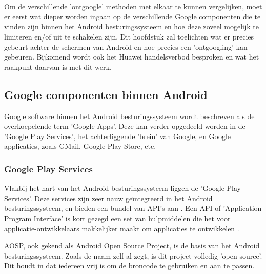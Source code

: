 \chapter{}
\label{ch:stand-van-zaken}



Om de verschillende 'ontgoogle' methoden met elkaar te kunnen vergelijken, moet er eerst wat dieper worden ingaan op de verschillende Google componenten die te vinden zijn binnen het Android besturingssysteem en hoe deze zoveel mogelijk te limiteren en/of uit te schakelen zijn. Dit hoofdstuk zal toelichten wat er precies gebeurt achter de schermen van Android en hoe precies een 'ontgoogling' kan gebeuren. Bijkomend wordt ook het Huawei handelsverbod besproken en wat het raakpunt daarvan is met dit werk.

\section{Google componenten binnen Android}
Google software binnen het Android besturingssysteem wordt beschreven als de overkoepelende term 'Google Apps'. Deze kan verder opgedeeld worden in de 'Google Play Services', het achterliggende 'brein' van Google, en Google applicaties, zoals GMail, Google Play Store, etc.

\subsection{Google Play Services}
Vlakbij het hart van het Android besturingssysteem liggen de 'Google Play Services'. Deze services zijn zeer nauw geïntegreerd in het Android besturingssysteem, en bieden een bundel van API's aan \autocite{marshall_google-play-services}. Een API of 'Application Program Interface' is kort gezegd een set van hulpmiddelen die het voor applicatie-ontwikkelaars makkelijker maakt om applicaties te ontwikkelen \autocite{beal_api}.

AOSP, ook gekend als Android Open Source Project, is de basis van het Android besturingssysteem. Zoals de naam zelf al zegt, is dit project volledig 'open-source'. Dit houdt in dat iedereen vrij is om de broncode te gebruiken en aan te passen. 

